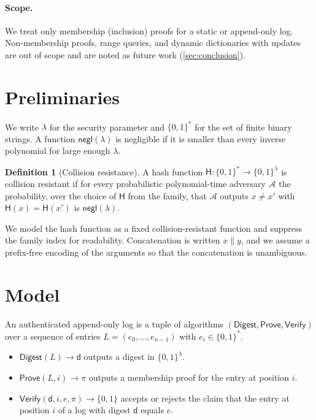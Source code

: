 \documentclass[11pt]{article}
\theoremstyle{plain}
\theoremstyle{definition}
\newtheorem{definition}[theorem]{Definition}
\theoremstyle{remark}
\newcommand{\hash}{\mathsf{H}}
\newcommand{\digest}{\mathsf{d}}
\newcommand{\bits}{\{0,1\}}
\newcommand{\secpar}{\lambda}
\newcommand{\adv}{\mathcal{A}}
\newcommand{\negl}{\mathsf{negl}}
\begin{document}
\paragraph{Scope.}
We treat only membership (inclusion) proofs for a static or append-only
log. Non-membership proofs, range queries, and dynamic dictionaries with
updates are out of scope and are noted as future work
(\cref{sec:conclusion}).

\section{Preliminaries}
\label{sec:prelim}

We write $\secpar$ for the security parameter and $\bits^{*}$ for the set
of finite binary strings. A function $\negl(\secpar)$ is negligible if it
is smaller than every inverse polynomial for large enough $\secpar$.

\begin{definition}[Collision resistance]
\label{def:cr}
A hash function $\hash \colon \bits^{*} \to \bits^{\secpar}$ is
collision resistant if for every probabilistic polynomial-time adversary
$\adv$ the probability, over the choice of $\hash$ from the family, that
$\adv$ outputs $x \neq x'$ with $\hash(x) = \hash(x')$ is
$\negl(\secpar)$.
\end{definition}

We model the hash function as a fixed collision-resistant function and
suppress the family index for readability. Concatenation is written
$x \mathbin{\|} y$, and we assume a prefix-free encoding of the arguments
so that the concatenation is unambiguous.

\section{Model}
\label{sec:model}

An authenticated append-only log is a tuple of algorithms
$(\mathsf{Digest}, \mathsf{Prove}, \mathsf{Verify})$ over a sequence of
entries $L = (e_0, \dots, e_{n-1})$ with $e_i \in \bits^{*}$.

\begin{itemize}
  \item $\mathsf{Digest}(L) \to \digest$ outputs a digest in
    $\bits^{\secpar}$.
  \item $\mathsf{Prove}(L, i) \to \pi$ outputs a membership proof for the
    entry at position $i$.
  \item $\mathsf{Verify}(\digest, i, e, \pi) \to \bits$ accepts or rejects
    the claim that the entry at position $i$ of a log with digest
    $\digest$ equals $e$.
\end{itemize}
\end{document}
